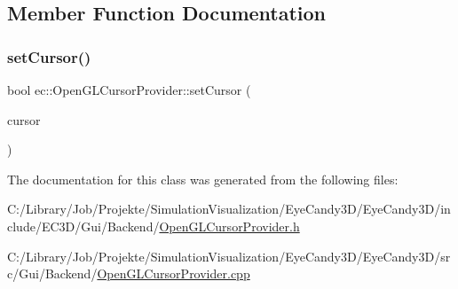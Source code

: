 \subsection{Member Function Documentation}
\mbox{\label{classec_1_1_open_g_l_cursor_provider_a1eadfdfdfeaac9f932bad8e16edfab3b}} 
\subsubsection{\texorpdfstring{set\+Cursor()}{setCursor()}}
{\footnotesize\ttfamily bool ec\+::\+Open\+G\+L\+Cursor\+Provider\+::set\+Cursor (\begin{DoxyParamCaption}\item[{Cursor\+Enum}]{cursor }\end{DoxyParamCaption})\hspace{0.3cm}{\ttfamily [override]}}



The documentation for this class was generated from the following files\+:\begin{DoxyCompactItemize}
\item 
C\+:/\+Library/\+Job/\+Projekte/\+Simulation\+Visualization/\+Eye\+Candy3\+D/\+Eye\+Candy3\+D/include/\+E\+C3\+D/\+Gui/\+Backend/\mbox{\hyperlink{_open_g_l_cursor_provider_8h}{Open\+G\+L\+Cursor\+Provider.\+h}}\item 
C\+:/\+Library/\+Job/\+Projekte/\+Simulation\+Visualization/\+Eye\+Candy3\+D/\+Eye\+Candy3\+D/src/\+Gui/\+Backend/\mbox{\hyperlink{_open_g_l_cursor_provider_8cpp}{Open\+G\+L\+Cursor\+Provider.\+cpp}}\end{DoxyCompactItemize}

